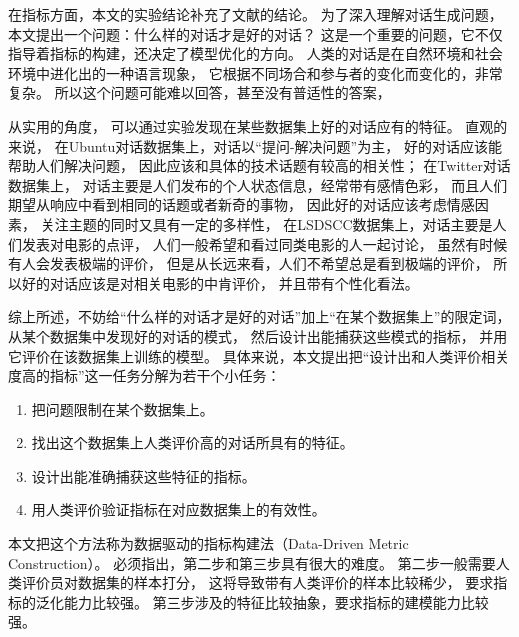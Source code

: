 在指标方面，本文的实验结论补充了文献\cite{HowNot}的结论。
为了深入理解对话生成问题，本文提出一个问题：什么样的对话才是好的对话？
这是一个重要的问题，它不仅指导着指标的构建，还决定了模型优化的方向。
人类的对话是在自然环境和社会环境中进化出的一种语言现象，
它根据不同场合和参与者的变化而变化的，非常复杂。
所以这个问题可能难以回答，甚至没有普适性的答案，

从实用的角度，
可以通过实验发现在某些数据集上好的对话应有的特征。
直观的来说，
在Ubuntu对话数据集上，对话以“提问-解决问题”为主，
好的对话应该能帮助人们解决问题，
因此应该和具体的技术话题有较高的相关性；
在Twitter对话数据集上，
对话主要是人们发布的个人状态信息，经常带有感情色彩，
而且人们期望从响应中看到相同的话题或者新奇的事物，
因此好的对话应该考虑情感因素，
关注主题的同时又具有一定的多样性，
在LSDSCC数据集上，对话主要是人们发表对电影的点评，
人们一般希望和看过同类电影的人一起讨论，
虽然有时候有人会发表极端的评价，
但是从长远来看，人们不希望总是看到极端的评价，
所以好的对话应该是对相关电影的中肯评价，
并且带有个性化看法。

综上所述，不妨给“什么样的对话才是好的对话”加上“在某个数据集上”的限定词，
从某个数据集中发现好的对话的模式，
然后设计出能捕获这些模式的指标，
并用它评价在该数据集上训练的模型。
具体来说，本文提出把“设计出和人类评价相关度高的指标”这一任务分解为若干个小任务：
\begin{enumerate}
    \item 把问题限制在某个数据集上。
    \item 找出这个数据集上人类评价高的对话所具有的特征。
    \item 设计出能准确捕获这些特征的指标。
    \item 用人类评价验证指标在对应数据集上的有效性。
\end{enumerate}

本文把这个方法称为数据驱动的指标构建法（Data-Driven Metric Construction）。
必须指出，第二步和第三步具有很大的难度。
第二步一般需要人类评价员对数据集的样本打分，
这将导致带有人类评价的样本比较稀少，
要求指标的泛化能力比较强。
第三步涉及的特征比较抽象，要求指标的建模能力比较强。
